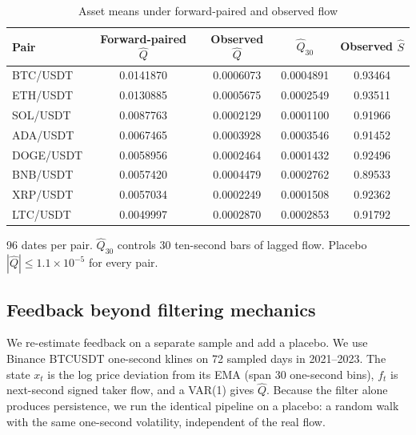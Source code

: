 \begin{table}[t]\centering\small
\begin{threeparttable}
\caption{Asset means under forward-paired and observed flow}\label{tab:assets}
\begin{tabular}{lcccc}
\toprule
Pair & Forward-paired $\hat Q$ & Observed $\hat Q$ & $\hat Q_{30}$ & Observed $\hat S$\\
\midrule
BTC/USDT & 0.0141870 & 0.0006073 & 0.0004891 & 0.93464\\
ETH/USDT & 0.0130885 & 0.0005675 & 0.0002549 & 0.93511\\
SOL/USDT & 0.0087763 & 0.0002129 & 0.0001100 & 0.91966\\
ADA/USDT & 0.0067465 & 0.0003928 & 0.0003546 & 0.91452\\
DOGE/USDT & 0.0058956 & 0.0002464 & 0.0001432 & 0.92496\\
BNB/USDT & 0.0057420 & 0.0004479 & 0.0002762 & 0.89533\\
XRP/USDT & 0.0057034 & 0.0002249 & 0.0001508 & 0.92362\\
LTC/USDT & 0.0049997 & 0.0002870 & 0.0002853 & 0.91792\\
\bottomrule
\end{tabular}
\begin{tablenotes}\footnotesize\item 96 dates per pair. $\hat Q_{30}$ controls 30 ten-second bars of lagged flow. Placebo $|\hat Q|\le1.1\times10^{-5}$ for every pair. \end{tablenotes}
\end{threeparttable}
\end{table}



\subsection{Feedback beyond filtering mechanics}

We re-estimate feedback on a separate sample and add a placebo. We use Binance BTCUSDT one-second klines on 72 sampled days in 2021--2023. The state $x_t$ is the log price deviation from its EMA (span 30 one-second bins), $f_t$ is next-second signed taker flow, and a VAR(1) gives $\hat Q$. Because the filter alone produces persistence, we run the identical pipeline on a placebo: a random walk with the same one-second volatility, independent of the real flow.

